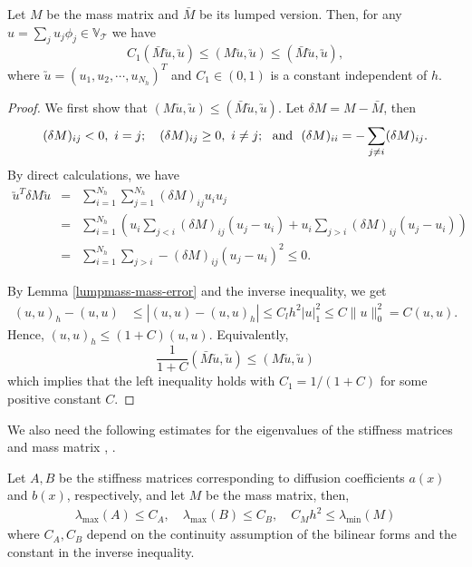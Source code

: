 \documentclass[smallcondensed]{svjour3}
\numberwithin{equation}{section} \numberwithin{table}{section}
\numberwithin{figure}{section}
\numberwithin{algorithm}{section}
\begin{document}
\begin{lemma} 
Let $M$ be the mass matrix and $\bar{M}$ be its lumped version. Then, for any $u=\textstyle{\sum}_j u_j\phi_j\in\mathbb{V}_\mathcal{T}$ we have
\begin{equation}\label{property1-M}
C_1(\bar{M}\utilde u,\utilde u)\leq(M\utilde u,\utilde u)\leq (\bar{M}\utilde u,\utilde u),
\end{equation}
where $\utilde{u} = (u_1,u_2,\cdots,u_{N_h})^{T}$ and $C_1\in(0,1)$ is a constant independent of $h$. 
\end{lemma}
\begin{proof}
We first show that $({M}\utilde u,\utilde u)\leq (\bar{M}\utilde u,\utilde u)$. Let $\delta M = M - \bar M$, then
$$
(\delta M)_{ij}<0, \ i=j; \quad(\delta M)_{ij} \geq 0, \ i\neq j; \ \ {\rm and} \ \  (\delta M)_{ii}=- \sum_{j\neq i}(\delta M)_{ij}.
$$
By direct calculations, we have
\begin{eqnarray*}
{\utilde{u}}^T\delta M\utilde{u} & = &\sum_{i=1}^{N_h}\sum_{j=1}^{N_h}(\delta M)_{ij} u_i u_j\\
& =& \sum_{i=1}^{N_h}\left({u}_i\sum_{j<i}(\delta M)_{ij}({u}_j-{u}_i)+{u}_i\sum_{j>i}(\delta M)_{ij}({u}_j-{u}_i)\right)\\
& = & \sum_{i=1}^{N_h}\sum_{j>i}-(\delta M)_{ij}({u}_j-{u}_i)^2\leq 0.
\end{eqnarray*}

By Lemma \ref{lumpmass-mass-error} and the inverse inequality, we get
\begin{align*}
(u,u)_h-(u,u)&\leq|(u,u)-(u,u)_h|\leq C_l h^2|u|_1^2\leq C\|u\|_0^2= C(u,u).
\end{align*}
Hence, $ (u,u)_h\leq(1+ C)(u,u)$. Equivalently,
$$
\frac{1}{1+ C}(\bar M\utilde u,\utilde u)\leq (M\utilde u,\utilde u)
$$
which implies that the left inequality holds with $C_1={1}/({1+ C})$ for some positive constant $C$.
\end{proof}

We also need the following estimates for the eigenvalues of the stiffness matrices and mass matrix \cite{fried1973bounds}, \cite{brenner2008book}.
\begin{lemma} \label{spectral4ABM}
Let $A, B$ be the stiffness matrices corresponding to diffusion coefficients $a(x)$ and $b(x)$, respectively, and let $M$ be the mass matrix, then, 
\begin{align}
\lambda_{\max}(A)\leq C_A,\quad \lambda_{\max}(B)\leq C_B,\quad C_Mh^2\leq\lambda_{\min}(M)
\end{align}
where $C_A, C_B$ depend on the continuity assumption of the bilinear forms and the constant in the inverse inequality. 
\end{lemma}
\end{document}
